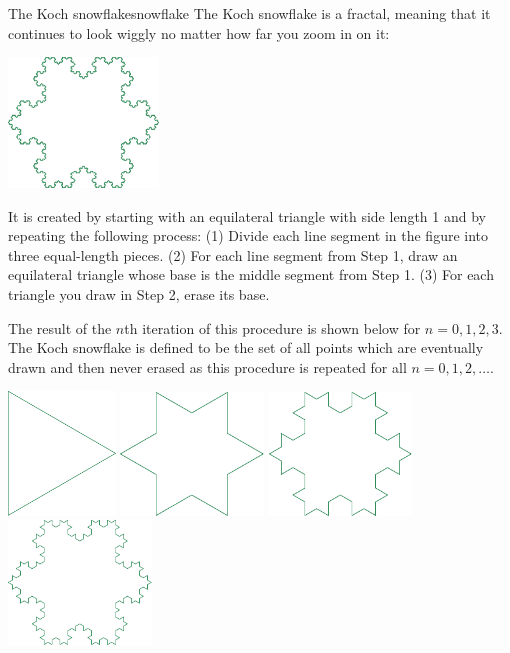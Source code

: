 \documentclass{watsonbook}
\begin{document}
\begin{exercise}{The Koch snowflake}{snowflake}
  The Koch snowflake is a fractal, meaning that it continues to look
  wiggly no matter how far you zoom in on it:

  \begin{center} 
    \includegraphics[width=4cm]{figures/koch7.pdf}
  \end{center}
  
  It is created by starting with an equilateral triangle with
  side length 1 and by repeating the following process: (1) Divide
  each line segment in the figure into three equal-length
  pieces. (2) For each line segment from Step 1, draw an equilateral
  triangle whose base is the middle segment from Step 1. (3) For
  each triangle you draw in Step 2, erase its base.

  The result of the $n$th iteration of this procedure is shown below
  for $n=0,1,2,3$. The Koch snowflake is defined to be the set of
  all points which are eventually drawn and then never erased as
  this procedure is repeated for all $n=0,1,2,\ldots$.
  
  \begin{center} 
    \includegraphics[width=2.85cm]{figures/koch0.pdf} \:
    \includegraphics[width=3.8cm]{figures/koch1.pdf} \:
    \includegraphics[width=3.8cm]{figures/koch2.pdf} \:
    \includegraphics[width=3.8cm]{figures/koch3.pdf}
  \end{center}
  

\end{exercise}
\end{document}
